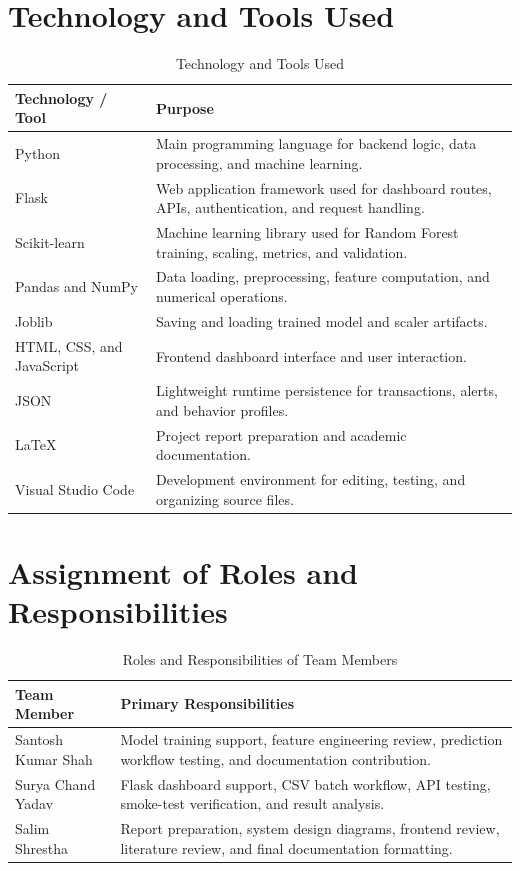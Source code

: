\documentclass[12pt,a4paper]{report}
\begin{document}
\section{Technology and Tools Used}
\begin{table}[H]
\centering
\caption{Technology and Tools Used}
\begin{tabular}{p{} p{}}
\toprule
\textbf{Technology / Tool} & \textbf{Purpose} \\
\midrule
Python & Main programming language for backend logic, data processing, and machine learning. \\
Flask & Web application framework used for dashboard routes, APIs, authentication, and request handling. \\
Scikit-learn & Machine learning library used for Random Forest training, scaling, metrics, and validation. \\
Pandas and NumPy & Data loading, preprocessing, feature computation, and numerical operations. \\
Joblib & Saving and loading trained model and scaler artifacts. \\
HTML, CSS, and JavaScript & Frontend dashboard interface and user interaction. \\
JSON & Lightweight runtime persistence for transactions, alerts, and behavior profiles. \\
LaTeX & Project report preparation and academic documentation. \\
Visual Studio Code & Development environment for editing, testing, and organizing source files. \\
\bottomrule
\end{tabular}
\end{table}

\section{Assignment of Roles and Responsibilities}
\begin{table}[H]
\centering
\caption{Roles and Responsibilities of Team Members}
\begin{tabular}{p{} p{}}
\toprule
\textbf{Team Member} & \textbf{Primary Responsibilities} \\
\midrule
Santosh Kumar Shah & Model training support, feature engineering review, prediction workflow testing, and documentation contribution. \\
Surya Chand Yadav & Flask dashboard support, CSV batch workflow, API testing, smoke-test verification, and result analysis. \\
Salim Shrestha & Report preparation, system design diagrams, frontend review, literature review, and final documentation formatting. \\
\bottomrule
\end{tabular}
\end{table}
\end{document}
